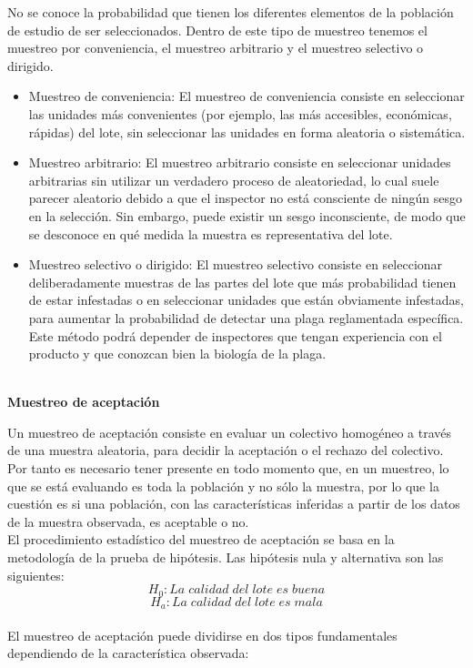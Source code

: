 No se conoce la probabilidad que tienen los diferentes elementos de la poblaci\'{o}n de estudio de ser seleccionados. Dentro de este tipo de muestreo tenemos el muestreo por conveniencia, el muestreo arbitrario y el muestreo selectivo o dirigido.
\begin{itemize}
\item Muestreo de conveniencia: El muestreo de conveniencia consiste en seleccionar las unidades m\'{a}s convenientes (por ejemplo, las m\'{a}s accesibles,
econ\'{o}micas, r\'{a}pidas) del lote, sin seleccionar las unidades en forma aleatoria o sistem\'{a}tica.\cite{MUES}
\item Muestreo arbitrario: El muestreo arbitrario consiste en seleccionar unidades arbitrarias sin utilizar un verdadero proceso de aleatoriedad, lo
cual suele parecer aleatorio debido a que el inspector no est\'{a} consciente de ning\'{u}n sesgo en la selecci\'{o}n. Sin embargo,
puede existir un sesgo inconsciente, de modo que se desconoce en qu\'{e} medida la muestra es representativa del lote.\cite{MUES}
\item Muestreo selectivo o dirigido: El muestreo selectivo consiste en seleccionar deliberadamente muestras de las partes del lote que m\'{a}s probabilidad
tienen de estar infestadas o en seleccionar unidades que est\'{a}n obviamente infestadas, para aumentar la probabilidad de
detectar una plaga reglamentada espec\'{i}fica. Este m\'{e}todo podr\'{a} depender de inspectores que tengan experiencia con el
producto y que conozcan bien la biolog\'{i}a de la plaga.\cite{MUES}
\end{itemize}

~\\\textbf{Muestreo de aceptaci\'{o}n}

Un muestreo de aceptaci\'{o}n consiste en evaluar un colectivo homog\'{e}neo a trav\'{e}s de una muestra aleatoria, para decidir la aceptaci\'{o}n o el rechazo del colectivo. Por tanto es necesario tener presente en todo momento que, en un muestreo, lo que se est\'{a} evaluando es toda la poblaci\'{o}n y no s\'{o}lo la muestra, por lo que la cuesti\'{o}n es si una poblaci\'{o}n, con las caracter\'{i}sticas inferidas a partir de los datos de la muestra observada, es aceptable o no.\cite{ACEP}
~\\El procedimiento estad\'{i}stico del muestreo de aceptaci\'{o}n se basa en la metodolog\'{i}a de la prueba de hip\'{o}tesis. Las hip\'{o}tesis nula y alternativa son las siguientes:
$$H_0:La \; calidad \; del \; lote \; es \; buena$$
$$H_a:La \; calidad \; del \; lote \; es \; mala$$
~\\El muestreo de aceptaci\'{o}n puede dividirse en dos tipos fundamentales dependiendo de la caracter\'{i}stica observada:

